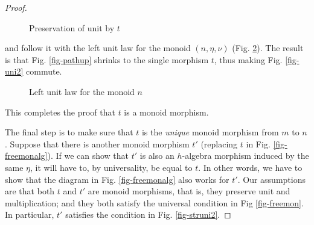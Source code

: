 \documentclass[letterpaper, 10 pt, conference]{ieeeconf}
\begin{document}
\begin{proof}
\begin{figure}[H]
\caption{Preservation of unit by $t$}
\label{fig-unitt}
\end{figure}

and follow it with the left unit law for the monoid $(n, \eta, \nu)$ (Fig. \ref{fig-lunitn}). The result is that Fig. \ref{fig-pathup} shrinks to the single morphism $t$, thus making Fig. \ref{fig-uni2} commute. 

\begin{figure}[H]
\centering
{}
\caption{Left unit law for the monoid $n$}
\label{fig-lunitn}
\end{figure}
This completes the proof that $t$ is a monoid morphism.


The final step is to make sure that $t$ is the \textit{unique} monoid morphism from $m$ to $n$. Suppose that there is another monoid morphism $t'$ (replacing $t$ in Fig. \ref{fig-freemonalg}). If we can show that $t'$ is also an $h$-algebra morphism induced by the same $\eta$, it will have to, by universality, be equal to $t$. In other words, we have to show that the diagram in Fig. \ref{fig-freemonalg} also works for $t'$. Our assumptions are that both $t$ and $t'$ are monoid morphisms, that is, they preserve unit and multiplication; and they both satisfy the universal condition in Fig \ref{fig-freemon}. In particular, $t'$ satisfies the condition in Fig. \ref{fig-struni2}.



\end{proof}
\end{document}
